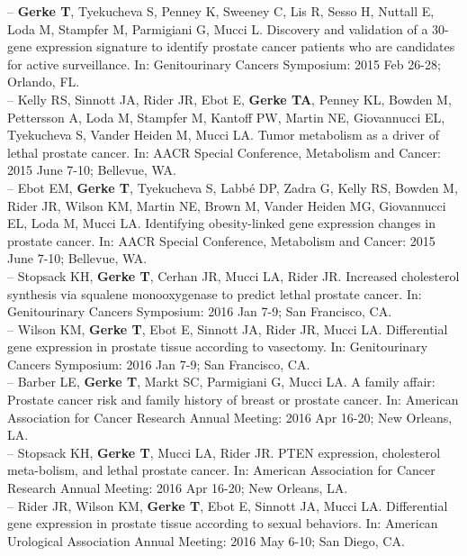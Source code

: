 \documentclass[11pt, a4paper]{article} %
\begin{document}
-- {\bf Gerke T}, Tyekucheva S, Penney K, Sweeney C, Lis R, Sesso H, Nuttall E, Loda M, Stampfer M, Parmigiani G, Mucci L. Discovery and validation of a 30-gene expression signature to identify prostate cancer patients who are candidates for active surveillance. In: Genitourinary Cancers Symposium: 2015 Feb 26-28; Orlando, FL.\\

-- Kelly RS, Sinnott JA, Rider JR, Ebot E, {\bf Gerke TA}, Penney KL, Bowden M, Pettersson A, Loda M, Stampfer M, Kantoff PW, Martin NE, Giovannucci EL, Tyekucheva S, Vander Heiden M, Mucci LA. Tumor metabolism as a driver of lethal prostate cancer. In: AACR Special Conference, Metabolism and Cancer: 2015 June 7-10; Bellevue, WA.\\

-- Ebot EM, {\bf Gerke T}, Tyekucheva S, Labb\'{e} DP, Zadra G, Kelly RS, Bowden M, Rider JR, Wilson KM, Martin NE, Brown M, Vander Heiden MG, Giovannucci EL, Loda M, Mucci LA. Identifying obesity-linked gene expression changes in prostate cancer. In: AACR Special Conference, Metabolism and Cancer: 2015 June 7-10; Bellevue, WA.\\

-- Stopsack KH, {\bf Gerke T}, Cerhan JR, Mucci LA, Rider JR. Increased cholesterol synthesis via squalene monooxygenase to predict lethal prostate cancer. In: Genitourinary Cancers Symposium: 2016 Jan 7-9; San Francisco, CA.\\

-- Wilson KM, {\bf Gerke T}, Ebot E, Sinnott JA, Rider JR, Mucci LA. Differential gene expression in prostate tissue according to vasectomy. In: Genitourinary Cancers Symposium: 2016 Jan 7-9; San Francisco, CA.\\

-- Barber LE, {\bf Gerke T}, Markt SC, Parmigiani G, Mucci LA. A family affair: Prostate cancer risk and family history of breast or prostate cancer. In: American Association for Cancer Research Annual Meeting: 2016 Apr 16-20; New Orleans, LA.\\

-- Stopsack KH, {\bf Gerke T}, Mucci LA, Rider JR. PTEN expression, cholesterol meta-bolism, and lethal prostate cancer. In: American Association for Cancer Research Annual Meeting: 2016 Apr 16-20; New Orleans, LA.\\

-- Rider JR, Wilson KM, {\bf Gerke T}, Ebot E, Sinnott JA, Mucci LA. Differential gene expression in prostate tissue according to sexual behaviors. In: American Urological Association Annual Meeting: 2016 May 6-10; San Diego, CA.\\
\end{document}
